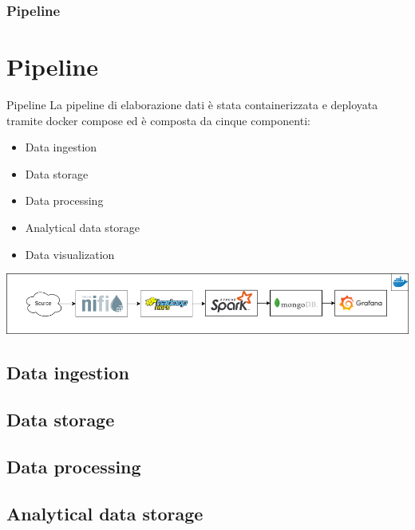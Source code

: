 \documentclass[13pt,aspectratio=169,t,xcolor=table]{beamer}
\begin{document}

\begin{frame}{}
    \frametitle{Pipeline}
\end{frame}

\section{Pipeline}
\begin{frame}{Pipeline}
    La pipeline di elaborazione dati è stata containerizzata e deployata tramite docker compose ed è composta da cinque componenti:
    \begin{itemize}
        \item Data ingestion
        \item Data storage
        \item Data processing
        \item Analytical data storage
        \item Data visualization
    \end{itemize}
    \begin{adjustbox}{margin=0.5cm 0cm 0cm 0.58cm, center} %
        \includegraphics[width=.99\textwidth]{res/pipeline.png}
    \end{adjustbox}
\end{frame}
\subsection{Data ingestion}
\subsection{Data storage}
\subsection{Data processing}
\subsection{Analytical data storage}
\end{document}

